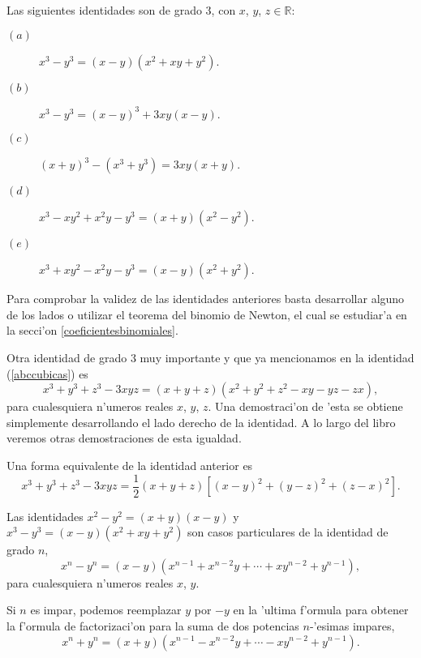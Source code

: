 \vei

\noindent Las siguientes identidades son de grado $3$, con $x$, $y$, $z \in \mathbb{R}$:
\begin{description}
\item[$(a)$] $x^{3}-y^{3}=(x-y)\left( x^{2}+xy+y^{2}\right)$.
\item[$(b)$] $x^{3}-y^{3}=(x-y)^{3}+3xy(x-y)$.
\item[$(c)$] $(x+y)^{3}-(x^{3}+y^{3})=3xy(x+y)$.
\item[$(d)$] $x^{3}-xy^{2}+x^{2}y-y^{3}=(x+y)(x^{2}-y^{2})$.
\item[$(e)$] $x^{3}+xy^{2}-x^{2}y-y^{3}=(x-y)(x^{2}+y^{2})$.
\end{description}

\noindent Para comprobar la validez de las identidades anteriores basta desarrollar alguno de los lados o utilizar el teorema del binomio de Newton, el cual se estudiar'a en la secci'on \ref{coeficientesbinomiales}.

\vei

\noindent Otra identidad  de grado $3$ muy importante y que ya mencionamos en la identidad (\ref{abccubicas}) es
$$
x^{3}+y^{3}+z^{3}-3xyz=(x+y+z)(x^{2}+y^{2}+z^{2}-xy-yz-zx),
$$
para cualesquiera n'umeros reales $x$, $y$, $z$.  Una demostraci'on de 'esta se obtiene simplemente desarrollando el lado derecho de la identidad.  A lo largo del libro veremos otras demostraciones de esta igualdad. 

Una forma equivalente de la identidad anterior es
$$
x^{3}+y^{3}+z^{3}-3xyz=\frac{1}{2}(x+y+z)\left[ \left( x-y\right)
^{2}+(y-z)^{2}+(z-x)^{2}\right].
$$

\vei


\noindent Las identidades $x^2 - y^2 =(x+y)(x-y)$ y $x^{3}-y^{3}=(x-y)\left( x^{2}+xy+y^{2}\right)$
son casos particulares de la identidad de grado $n$,
\begin{equation}
      x^n-y^n=(x-y)(x^{n-1} + x^{n-2} y + \cdots + x y^{n-2} + y^{n-1}),
\label{antesdesophie}
\end{equation}
para cualesquiera n'umeros reales $x$, $y$.

\noindent Si $n$ es impar, podemos reemplazar $y$ por $-y$ en la 'ultima f'ormula para obtener
la f'ormula de factorizaci'on para la suma de dos potencias $n$-'esimas impares,
\begin{equation}
x^n+y^n=(x+y)(x^{n-1} - x^{n-2} y + \cdots - x y^{n-2} + y^{n-1}).
\label{identidadxalanyalan}
\end{equation}

